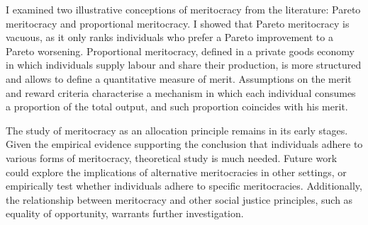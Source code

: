 I examined two illustrative conceptions of meritocracy from the literature: Pareto meritocracy and proportional meritocracy. I showed that Pareto meritocracy is vacuous, as it only ranks individuals who prefer a Pareto improvement to a Pareto worsening. Proportional meritocracy, defined in a private goods economy in which individuals supply labour and share their production, is more structured and allows to define a quantitative measure of merit. Assumptions on the merit and reward criteria characterise a mechanism in which each individual consumes a proportion of the total output, and such proportion coincides with his merit.

The study of meritocracy as an allocation principle remains in its early stages. Given the empirical evidence supporting the conclusion that individuals adhere to various forms of meritocracy, theoretical study is much needed. Future work could explore the implications of alternative meritocracies in other settings, or empirically test whether individuals adhere to specific meritocracies. Additionally, the relationship between meritocracy and other social justice principles, such as equality of opportunity, warrants further investigation.

